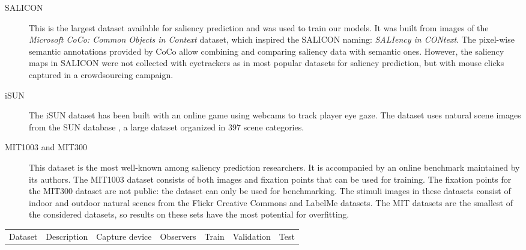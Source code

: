 \documentclass[10pt,twocolumn,letterpaper]{article}
\begin{document}
\begin{description}
\item[SALICON \cite{jiang2015salicon} ] This is the largest dataset available for saliency prediction and was used to train our models.
It was built from images of the \textit{Microsoft CoCo: Common Objects in Context} \cite{lin2014microsoft} dataset, which inspired the SALICON naming: \textit{SALIency in CONtext}. The pixel-wise semantic annotations provided by CoCo allow combining and comparing saliency data with semantic ones.
However, the saliency maps in SALICON were not collected with eyetrackers as in most popular datasets for saliency prediction, but with mouse clicks captured in a crowdsourcing campaign.
\item[iSUN \cite{xu2015turkergaze}] The iSUN dataset has been built with an online game using  webcams to track player eye gaze. The dataset uses natural scene images from the SUN database \cite{xiao2010sun}, a large dataset  organized in 397 scene categories.
\item[MIT1003 and MIT300 \cite{judd2009learning}] This dataset is the most well-known among saliency prediction researchers. It is accompanied by an online benchmark maintained by its authors.
The MIT1003 dataset consists of both images and fixation points that can be used for training. The fixation points for the MIT300 dataset are not public: the dataset can only be used for benchmarking.
The stimuli images in these datasets consist of indoor and outdoor natural scenes from the Flickr Creative Commons and LabelMe \cite{russell2008labelme} datasets. The MIT datasets are the smallest of the considered datasets, so results on these sets have the most potential for overfitting. %
\end{description}\begin{table*}
\begin{center}
\begin{tabular}{lllllll}
\toprule
Dataset							&	Description			 & Capture device 	& Observers & Train 	& Validation & Test \\

\end{tabular}
\end{center}
\end{table*}
\end{document}

